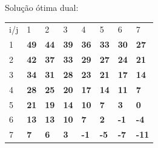 \documentclass[11pt]{article} %
\begin{document}
\newpage
Solução ótima dual:
\begin{table}[h]
\centering
\begin{tabular}{llllllll}
i/j                    & 1                                & 2                                & 3                                & 4                                & 5                                & 6                                & 7                                 \\ \cline{2-8} 
\multicolumn{1}{l|}{1} & \multicolumn{1}{l|}{\textbf{49}}  & \multicolumn{1}{l|}{\textbf{44}} & \multicolumn{1}{l|}{\textbf{39}} & \multicolumn{1}{l|}{\textbf{36}} & \multicolumn{1}{l|}{\textbf{33}} & \multicolumn{1}{l|}{\textbf{30}} & \multicolumn{1}{l|}{\textbf{27}}  \\ \cline{2-8} 
\multicolumn{1}{l|}{2} & \multicolumn{1}{l|}{\textbf{42}} & \multicolumn{1}{l|}{\textbf{37}} & \multicolumn{1}{l|}{\textbf{33}} & \multicolumn{1}{l|}{\textbf{29}} & \multicolumn{1}{l|}{\textbf{27}} & \multicolumn{1}{l|}{\textbf{24}} & \multicolumn{1}{l|}{\textbf{21}}  \\ \cline{2-8} 
\multicolumn{1}{l|}{3} & \multicolumn{1}{l|}{\textbf{34}} & \multicolumn{1}{l|}{\textbf{31}} & \multicolumn{1}{l|}{\textbf{28}} & \multicolumn{1}{l|}{\textbf{23}} & \multicolumn{1}{l|}{\textbf{21}} & \multicolumn{1}{l|}{\textbf{17}} & \multicolumn{1}{l|}{\textbf{14}}  \\ \cline{2-8} 
\multicolumn{1}{l|}{4} & \multicolumn{1}{l|}{\textbf{28}} & \multicolumn{1}{l|}{\textbf{25}} & \multicolumn{1}{l|}{\textbf{20}} & \multicolumn{1}{l|}{\textbf{17}} & \multicolumn{1}{l|}{\textbf{14}} & \multicolumn{1}{l|}{\textbf{11}} & \multicolumn{1}{l|}{\textbf{7}}   \\ \cline{2-8} 
\multicolumn{1}{l|}{5} & \multicolumn{1}{l|}{\textbf{21}} & \multicolumn{1}{l|}{\textbf{19}} & \multicolumn{1}{l|}{\textbf{14}} & \multicolumn{1}{l|}{\textbf{10}} & \multicolumn{1}{l|}{\textbf{7}}  & \multicolumn{1}{l|}{\textbf{3}}  & \multicolumn{1}{l|}{\textbf{0}}   \\ \cline{2-8} 
\multicolumn{1}{l|}{6} & \multicolumn{1}{l|}{\textbf{13}} & \multicolumn{1}{l|}{\textbf{13}} & \multicolumn{1}{l|}{\textbf{10}} & \multicolumn{1}{l|}{\textbf{7}}  & \multicolumn{1}{l|}{\textbf{2}}  & \multicolumn{1}{l|}{\textbf{-1}} & \multicolumn{1}{l|}{\textbf{-4}}  \\ \cline{2-8} 
\multicolumn{1}{l|}{7} & \multicolumn{1}{l|}{\textbf{7}}  & \multicolumn{1}{l|}{\textbf{6}}  & \multicolumn{1}{l|}{\textbf{3}}  & \multicolumn{1}{l|}{\textbf{-1}} & \multicolumn{1}{l|}{\textbf{-5}} & \multicolumn{1}{l|}{\textbf{-7}} & \multicolumn{1}{l|}{\textbf{-11}} \\ \cline{2-8} 
\end{tabular}
\end{table}
\end{document}
